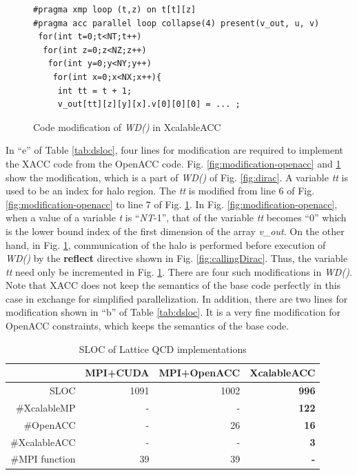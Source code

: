 \begin{figure}[h]
\centering
\begin{lstlisting}
#pragma xmp loop (t,z) on t[t][z]
#pragma acc parallel loop collapse(4) present(v_out, u, v)
 for(int t=0;t<NT;t++)
  for(int z=0;z<NZ;z++)
   for(int y=0;y<NY;y++)
    for(int x=0;x<NX;x++){
     int tt = t + 1;
     v_out[tt][z][y][x].v[0][0][0] = ... ;
\end{lstlisting}\vspace{-1.5ex}
\caption{Code modification of {\it WD()} in XcalableACC}\label{fig:modification-xacc}
\end{figure}

In ``e'' of Table \ref{tab:dsloc},
four lines for modification are required to implement the XACC code from the OpenACC code.
Fig. \ref{fig:modification-openacc} and \ref{fig:modification-xacc} show the modification,
which is a part of {\it WD()} of Fig. \ref{fig:dirac}.
A variable {\it tt} is used to be an index for halo region.
The {\it tt} is modified from line 6 of Fig. \ref{fig:modification-openacc} to line 7 of Fig. \ref{fig:modification-xacc}.
In Fig. \ref{fig:modification-openacc},
when a value of a variable {\it t} is ``{\it NT}-1'',
that of the variable {\it tt} becomes ``0'' which is the lower bound index of the first dimension of the array {\it v\_out}.
On the other hand,
in Fig. \ref{fig:modification-xacc},
communication of the halo is performed before execution of {\it WD()} by the {\bf reflect} directive shown in Fig. \ref{fig:callingDirac}.
Thus,
the variable {\it tt} need only be incremented in Fig. \ref{fig:modification-xacc}.
There are four such modifications in {\it WD()}.
Note that
XACC does not keep the semantics of the base code perfectly in this case
in exchange for simplified parallelization.
In addition,
there are two lines for modification shown in ``b'' of Table \ref{tab:dsloc}.
It is a very fine modification for OpenACC constraints,
which keeps the semantics of the base code.

\begin{table}[h]
\renewcommand{\arraystretch}{1.2}
\centering
\caption{SLOC of Lattice QCD implementations} \label{tab:sloc}
\begin{tabular}[h]{r|rrr} \hline
               & MPI+CUDA & MPI+OpenACC & {\bf XcalableACC}  \\ \hline
SLOC           & 1091     & 1002        & {\bf 996} \\ \hline
\#XcalableMP   & -        & -           & {\bf 122} \\
\#OpenACC      & -        & 26          & {\bf 16}  \\
\#XcalableACC  & -        & -           & {\bf 3}   \\
\#MPI function & 39       & 39          & {\bf -}   \\ \hline
\end{tabular}
\end{table}

